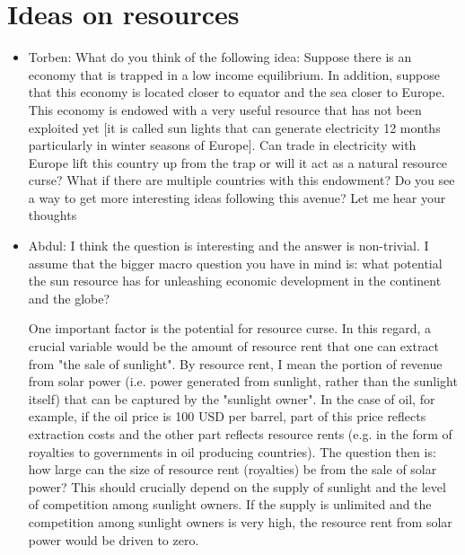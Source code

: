 \documentclass[12pt]{article}%
\begin{document}
\section{Ideas on resources}
\begin{itemize}
     
\item Torben: What do you think of the following idea:
Suppose there is an economy that is trapped in a low income equilibrium. In addition, suppose that this economy is located closer to equator and the sea closer to Europe. This economy is endowed with a very useful resource that has not been exploited yet [it is called sun lights that can generate electricity 12 months particularly in winter seasons of Europe]. Can trade in electricity with Europe lift this country up from the trap or will it act as a natural resource curse? What if there are multiple countries with this endowment? Do you see a way to get more interesting ideas following this avenue? Let me hear your thoughts 
\item Abdul: I think the question is interesting and the answer is non-trivial. I assume that the bigger macro question you have in mind is: what potential the sun resource has for unleashing economic development in the continent and the globe? 

One important factor is the potential for resource curse. In this regard, a crucial variable would be the amount of resource rent that one can extract from "the sale of sunlight". By resource rent, I mean the portion of revenue from solar power (i.e. power generated from sunlight, rather than the sunlight itself) that can be captured by the "sunlight owner". In the case of oil, for example, if the oil price is 100 USD per barrel, part of this price reflects extraction costs and the other part reflects resource rents (e.g. in the form of royalties to governments in oil producing countries). The question then is: how large can the size of resource rent (royalties) be from the sale of solar power? This should crucially depend on the supply of sunlight and the level of competition among sunlight owners. If the supply is unlimited and the competition among sunlight owners is very high, the resource rent from solar power would be driven to zero.


\end{itemize}
\end{document}
